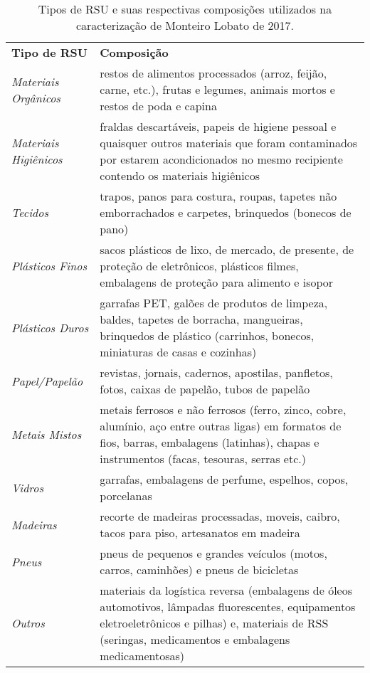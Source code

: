 \begin{table}[htbp]
\centering
\caption{Tipos de RSU e suas respectivas composições utilizados na caracterização de Monteiro Lobato de 2017.}
\label{tab:tipos_rsu}
	\begin{tabular}{p{9.645em}|p{28.145em}}
	\rowcolor[rgb]{ .969,  .588,  .275} \textbf{Tipo de RSU} & \textbf{Composição} \\
	\rowcolor[rgb]{ .992,  .914,  .851} \textit{Materiais Orgânicos} & restos de alimentos processados (arroz, feijão, carne, etc.), frutas e legumes, animais mortos e restos de poda e capina \\
	\rowcolor[rgb]{ .984,  .831,  .706} \textit{Materiais Higiênicos} & fraldas descartáveis, papeis de higiene pessoal e quaisquer outros materiais que foram contaminados por estarem acondicionados no mesmo recipiente contendo os materiais higiênicos \\
	\rowcolor[rgb]{ .992,  .914,  .851} \textit{Tecidos} & trapos, panos para costura, roupas, tapetes não emborrachados e carpetes, brinquedos (bonecos de pano) \\
	\rowcolor[rgb]{ .984,  .831,  .706} \textit{Plásticos Finos} & sacos plásticos de lixo, de mercado, de presente, de proteção de eletrônicos, plásticos filmes, embalagens de proteção para alimento e isopor \\
	\rowcolor[rgb]{ .992,  .914,  .851} \textit{Plásticos Duros} & garrafas PET, galões de produtos de limpeza, baldes, tapetes de borracha, mangueiras, brinquedos de plástico (carrinhos, bonecos, miniaturas de casas e cozinhas) \\
	\rowcolor[rgb]{ .984,  .831,  .706} \textit{Papel/Papelão} & revistas, jornais, cadernos, apostilas, panfletos, fotos, caixas de papelão, tubos de papelão \\
	\rowcolor[rgb]{ .992,  .914,  .851} \textit{Metais Mistos} & metais ferrosos e não ferrosos (ferro, zinco, cobre, alumínio, aço entre outras ligas) em formatos de fios, barras, embalagens (latinhas), chapas e instrumentos (facas, tesouras, serras etc.) \\
	\rowcolor[rgb]{ .984,  .831,  .706} \textit{Vidros} & garrafas, embalagens de perfume, espelhos, copos, porcelanas \\
	\rowcolor[rgb]{ .992,  .914,  .851} \textit{Madeiras} & recorte de madeiras processadas, moveis, caibro, tacos para piso, artesanatos em madeira \\
	\rowcolor[rgb]{ .984,  .831,  .706} \textit{Pneus} &  pneus de pequenos e grandes veículos (motos, carros, caminhões) e pneus de bicicletas \\
	\rowcolor[rgb]{ .992,  .914,  .851} \textit{Outros} & materiais da logística reversa (embalagens de óleos automotivos, lâmpadas fluorescentes, equipamentos eletroeletrônicos e pilhas) e, materiais de RSS (seringas, medicamentos e embalagens medicamentosas) \\
	\bottomrule
\end{tabular}%
\end{table}




